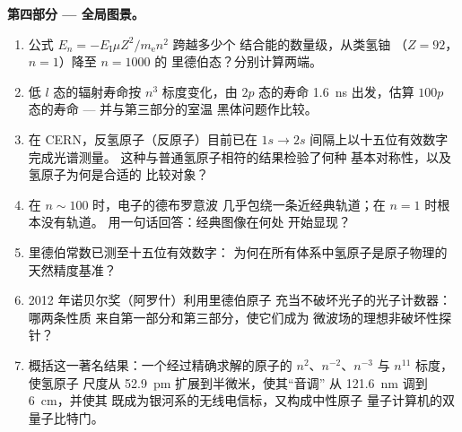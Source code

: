\begin{problem}
\medskip\noindent\textbf{第四部分 --- 全局图景。}
\begin{enumerate}[resume]
  \item 公式 $E_n = -E_{\text{I}}\mu Z^2/m_{\text{e}}n^2$ 跨越多少个
        结合能的数量级，从类氢铀
        （$Z = 92$，$n = 1$）降至 $n = 1000$ 的
        里德伯态？分别计算两端。
  \item 低 $l$ 态的辐射寿命按 $n^3$ 标度变化，由
        $2p$ 态的寿命 \qty{1.6}{ns} 出发，估算
        $100p$ 态的寿命 --- 并与第三部分的室温
        黑体问题作比较。
  \item 在 CERN，反氢原子（反原子）目前已在
        $1s \to 2s$ 间隔上以十五位有效数字完成光谱测量。
        这种与普通氢原子相符的结果检验了何种
        基本对称性，以及氢原子为何是合适的
        比较对象？
  \item 在 $n \sim 100$ 时，电子的德布罗意波
        几乎包绕一条近经典轨道；在 $n = 1$ 时根本没有轨道。
        用一句话回答：经典图像在何处
        开始显现？
  \item 里德伯常数已测至十五位有效数字：
        为何在所有体系中氢原子是原子物理的
        天然精度基准？
  \item 2012 年诺贝尔奖（阿罗什）利用里德伯原子
        充当不破坏光子的光子计数器：哪两条性质
        来自第一部分和第三部分，使它们成为
        微波场的理想非破坏性探针？
  \item 概括这一著名结果：一个经过精确求解的原子的
        $n^2$、$n^{-2}$、$n^{-3}$ 与 $n^{11}$ 标度，使氢原子
        尺度从 \qty{52.9}{pm} 扩展到半微米，使其“音调”
        从 \qty{121.6}{nm} 调到 \qty{6}{cm}，并使其
        既成为银河系的无线电信标，又构成中性原子
        量子计算机的双量子比特门。
\end{enumerate}
\end{problem}
